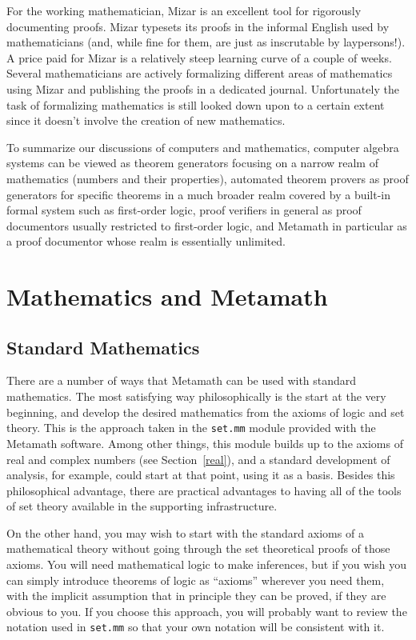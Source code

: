 For the working mathematician, Mizar is an excellent tool for rigorously
documenting proofs. Mizar typesets its proofs in the informal English used by
mathematicians (and, while fine for them, are just as inscrutable by
laypersons!). A price paid for Mizar is a relatively steep learning curve of a
couple of weeks.  Several mathematicians are actively formalizing different
areas of mathematics using Mizar and publishing the proofs in a dedicated
journal. Unfortunately the task of formalizing mathematics is still looked
down upon to a certain extent since it doesn't involve the creation of new
mathematics.

To summarize our discussions of computers and mathematics, computer algebra
systems can be viewed as theorem generators focusing on a narrow realm of
mathematics (numbers and their properties), automated theorem provers as proof
generators for specific theorems in a much broader realm covered by a built-in
formal system such as first-order logic, proof verifiers in general as proof
documentors usually restricted to first-order logic, and Metamath in
particular as a proof documentor whose realm is essentially unlimited.


\section{Mathematics and Metamath}

\subsection{Standard Mathematics}

There are a number of ways that Metamath can be used with
standard mathematics.  The most satisfying way philosophically is the start at
the very beginning, and develop the desired mathematics from the axioms of
logic and set theory.  This is the approach taken in the
\texttt{set.mm} module provided with
the Metamath software.  Among other things, this module builds up to the
axioms of real and complex numbers (see Section~\ref{real}), and a standard development of analysis, for
example, could start at that point, using it as a basis.   Besides this
philosophical advantage, there are practical advantages to having all of the
tools of set theory available in the supporting infrastructure.

On the other hand, you may wish to start with the standard axioms of a
mathematical theory without going through the set theoretical proofs of those
axioms.  You will need mathematical logic to make inferences, but if you wish
you can simply introduce theorems of logic as
``axioms'' wherever you need them, with the implicit assumption
that in principle they can be proved, if they are obvious to you.  If you
choose this approach, you will probably want to review the notation used in
\texttt{set.mm} so that your own
notation will be consistent with it.

